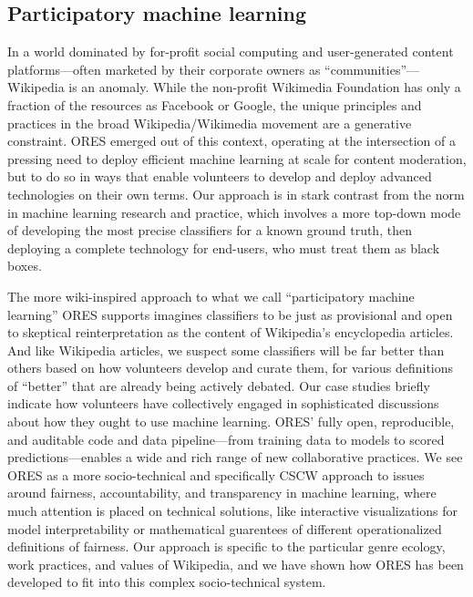 \subsection{Participatory machine learning}
In a world dominated by for-profit social computing and user-generated content platforms---often marketed by their corporate owners as ``communities''\cite{gillespie2018custodians}---Wikipedia is an anomaly. While the non-profit Wikimedia Foundation has only a fraction of the resources as Facebook or Google, the unique principles and practices in the broad Wikipedia/Wikimedia movement are a generative constraint. ORES emerged out of this context, operating at the intersection of a pressing need to deploy efficient machine learning at scale for content moderation, but to do so in ways that enable volunteers to develop and deploy advanced technologies on their own terms. Our approach is in stark contrast from the norm in machine learning research and practice, which involves a more top-down mode of developing the most precise classifiers for a known ground truth, then deploying a complete technology for end-users, who must treat them as black boxes.

The more wiki-inspired approach to what we call ``participatory machine learning'' ORES supports imagines classifiers to be just as provisional and open to skeptical reinterpretation as the content of Wikipedia's encyclopedia articles. And like Wikipedia articles, we suspect some classifiers will be far better than others based on how volunteers develop and curate them, for various definitions of ``better'' that are already being actively debated. Our case studies briefly indicate how volunteers have collectively engaged in sophisticated discussions about how they ought to use machine learning. ORES' fully open, reproducible, and auditable code and data pipeline---from training data to models to scored predictions---enables a wide and rich range of new collaborative practices. We see ORES as a more socio-technical and specifically CSCW approach to issues around fairness, accountability, and transparency in machine learning, where much attention is placed on technical solutions, like interactive visualizations for model interpretability or mathematical guarentees of different operationalized definitions of fairness. Our approach is specific to the particular genre ecology, work practices, and values of Wikipedia, and we have shown how ORES has been developed to fit into this complex socio-technical system.

